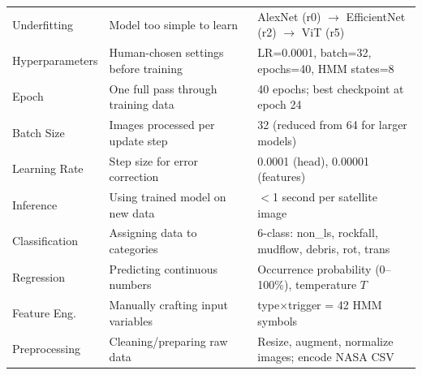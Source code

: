 \documentclass[11pt]{article}
\begin{document}
\begin{center}
\begin{tabularx}{\textwidth}{@{}lXX@{}}
Underfitting   & Model too simple to learn                    & AlexNet (r0) $\to$ EfficientNet (r2) $\to$ ViT (r5) \\
Hyperparameters & Human-chosen settings before training       & LR=0.0001, batch=32, epochs=40, HMM states=8 \\
Epoch          & One full pass through training data          & 40 epochs; best checkpoint at epoch 24 \\
Batch Size     & Images processed per update step             & 32 (reduced from 64 for larger models) \\
Learning Rate  & Step size for error correction               & 0.0001 (head), 0.00001 (features) \\
Inference      & Using trained model on new data              & $<$1 second per satellite image \\
Classification & Assigning data to categories                 & 6-class: non\_ls, rockfall, mudflow, debris, rot, trans \\
Regression     & Predicting continuous numbers                & Occurrence probability (0--100\%), temperature $T$ \\
Feature Eng.   & Manually crafting input variables            & type$\times$trigger = 42 HMM symbols \\
Preprocessing  & Cleaning/preparing raw data                  & Resize, augment, normalize images; encode NASA CSV \\
\bottomrule
\end{tabularx}
\end{center}
\end{document}
